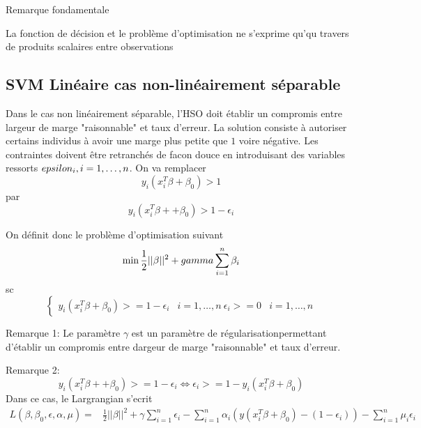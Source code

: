 \documentclass{article}
\begin{document}
Remarque fondamentale

La fonction de d\'ecision et le probl\`eme d'optimisation ne s'exprime qu'qu travers de produits scalaires entre observations

\subsection{SVM Lin\'eaire cas non-lin\'eairement s\'eparable}

Dans le cas non lin\'eairement s\'eparable, l'HSO doit \'etablir un compromis entre largeur de marge "raisonnable" et taux d'erreur. 
La solution consiste \`a autoriser certains individus \`a avoir une marge plus petite que $1$ voire n\'egative. Les contraintes doivent \^etre retranch\'es de facon douce en introduisant des variables ressorts $\\epsilon_i,i=1,\ldots,n$. On va remplacer 
\begin{equation}
y_i(x_i^T\beta+\beta_0)>1
\end{equation}
par
\begin{equation}
y_i(x_i^T\beta++\beta_0)>1-\epsilon_i
\end{equation}

On d\'efinit donc le probl\`eme d'optimisation suivant
\begin{equation}
\min \frac{1}{2}||\beta||^2+\\gamma\sum_{i=1}^n\beta_i
\end{equation}
sc
\begin{equation}
\left\{\begin{array}{rcl}
y_i(x_i^T\beta+\beta_0)>=1-\epsilon_i & i=1,\ldots,n\
\epsilon_i>=0 & i=1,\ldots,n
\end{array}\right.
\end{equation}

Remarque 1: Le param\`etre $\gamma$ est un param\`etre de r\'egularisationpermettant d'\'etablir un compromis entre dargeur de marge "raisonnable" et taux d'erreur.

Remarque 2:
\begin{equation}
y_i(x_i^T\beta++\beta_0)>=1-\epsilon_i\Leftrightarrow \epsilon_i>=1-y_i(x_i^T\beta+\beta_0)
\end{equation}
Dans ce cas, le Largrangian s'ecrit
\begin{equation}
\begin{split}
L(\beta,\beta_0,\epsilon,\alpha,\mu)=&\frac{1}{2}||\beta||^2+\gamma\sum_{i=1}^n\epsilon_i-\sum_{i=1}^n\alpha_i(y(x_i^T\beta+\beta_0)-(1-\epsilon_i))-\sum_{i=1}^n\mu_i\epsilon_i
\end{split}
\end{equation}
\end{document}
